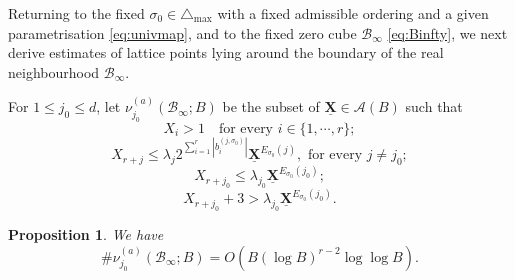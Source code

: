 \documentclass[11pt,letterpaper]{amsart}
\newcommand{\CA}{{\mathcal {A}}}
\newcommand{\CB}{{\mathcal {B}}}
\newcommand{\XX}{\underline{\mathbf{X}}}
\theoremstyle{plain}
\numberwithin{equation}{section}
\newtheorem{proposition}[theorem]{Proposition}
\theoremstyle{definition}
\theoremstyle{remark}
\begin{document}
Returning to the fixed $\sigma_0\in\triangle_{\max}$ with a fixed admissible ordering and a given parametrisation \eqref{eq:univmap}, and to the fixed zero cube $\CB_\infty$ \eqref{eq:Binfty}, we next derive estimates of lattice points lying around the boundary of the real neighbourhood $\CB_\infty$.

For $1\leqslant j_0\leqslant d$, let $\nu_{j_0}^{(a)}(\CB_\infty;B)$  be the subset of $\XX\in \CA(B)$ such that
\begin{equation}\label{eq:nusigmaA}
	X_i>1 \quad\text{for every } i\in\{1,\cdots,r\};
\end{equation}	
\begin{equation}\label{eq:nusigmaB2}
	X_{r+j}\leqslant\lambda_{j} 2^{\sum_{i=1}^{r}|b_{i}^{(j,\sigma_0)}|}\XX^{E_{\sigma_0}(j)},\text{ for every } j\neq j_0;
\end{equation}
	\begin{equation}\label{eq:nusigmaB1}
	X_{r+j_0}\leqslant\lambda_{j_0} \XX^{E_{\sigma_0}(j_0)};
\end{equation} 
\begin{equation}\label{eq:sigmaa}
	X_{r+j_0}+3>\lambda_{j_0} \XX^{E_{\sigma_0}(j_0)}.
\end{equation}
\begin{proposition}\label{prop:nusigmaWBa} We have
	$$\#\nu_{j_0}^{(a)}(\CB_\infty;B)=O(B(\log B)^{r-2}\log\log B).$$
\end{proposition}
\end{document}
